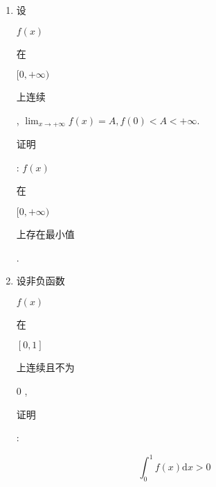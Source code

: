\documentclass[10pt]{article}
\begin{document}
\begin{enumerate}
  \item \begin{CJK}{UTF8}{mj}设\end{CJK} $f(x)$ \begin{CJK}{UTF8}{mj}在\end{CJK} $[0,+\infty)$ \begin{CJK}{UTF8}{mj}上连续\end{CJK}, $\lim _{x \rightarrow+\infty} f(x)=A, f(0)<A<+\infty$. \begin{CJK}{UTF8}{mj}证明\end{CJK}: $f(x)$ \begin{CJK}{UTF8}{mj}在\end{CJK} $[0,+\infty)$ \begin{CJK}{UTF8}{mj}上存在最小值\end{CJK}.

  \item \begin{CJK}{UTF8}{mj}设非负函数\end{CJK} $f(x)$ \begin{CJK}{UTF8}{mj}在\end{CJK} $[0,1]$ \begin{CJK}{UTF8}{mj}上连续且不为\end{CJK} 0 , \begin{CJK}{UTF8}{mj}证明\end{CJK}:

\end{enumerate}
$$
\int_{0}^{1} f(x) \mathrm{d} x>0
$$
\end{document}
